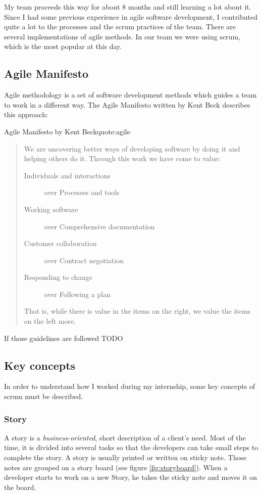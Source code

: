 My team proceeds this way for about 8 months and still learning a lot about it.
Since I had some previous experience in agile software development, I contributed quite a lot
to the processes and the \gls{scrum} practices of the team.
There are several implementations of agile methods. In our team we were using \gls{scrum}, which is the most popular at this day.

\subsection{Agile Manifesto}
Agile methodology is a set of software development methods which guides a team to work in a different way.
The Agile Manifesto written by Kent Beck describes this approach:

\begin{figureGraphics}{Agile Manifesto by Kent Beck}{quote:agile}
\begin{quotation}
    We are uncovering better ways of developing software by doing it and helping others do it. Through this work we have come to value:
    \begin{description}
        \item[Individuals and interactions] over Processes and tools
        \item[Working software] over Comprehensive documentation
        \item[Customer collaboration] over Contract negotiation
        \item[Responding to change] over Following a plan
    \end{description}
    That is, while there is value in the items on the right, we value the items on the left more.
\end{quotation}
\end{figureGraphics}

If those guidelines are followed
TODO

\subsection{Key concepts}
In order to understand how I worked during my internship, some key concepts of \gls{scrum} must be described.

\subsubsection{Story}\label{sec:story}
A story is a \emph{business-oriented}, short description of a client's need.
Most of the time, it is divided into several tasks so that the developers
can take small steps to complete the story. A story is usually printed or
written on sticky note. Those notes are grouped on a story board (see figure
\ref{fig:storyboard}). When a developer starts to work on a new Story, he takes
the sticky note and moves it on the board.


